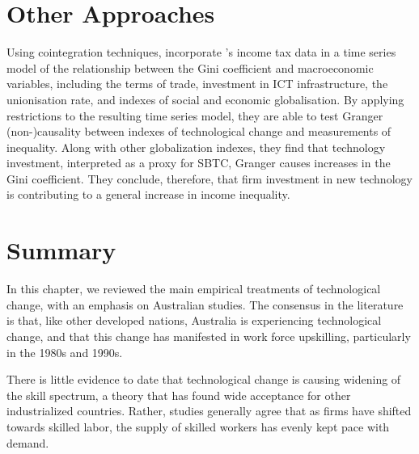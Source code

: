 
\section{Other Approaches}

Using cointegration techniques, \citet{Gaston2009} incorporate \citet{Leigh2005}'s income tax data in a time series model of the relationship between the Gini coefficient and macroeconomic variables, including the terms of trade, investment in ICT infrastructure, the unionisation rate, and indexes of social and economic globalisation. By applying restrictions to the resulting time series model, they are able to test Granger (non-)causality between indexes of technological change and measurements of inequality. Along with other globalization indexes, they find that technology investment, interpreted as a proxy for SBTC, Granger causes increases in the Gini coefficient. They conclude, therefore, that firm investment in new technology is contributing to a general increase in income inequality.

\section{Summary}

In this chapter, we reviewed the main empirical treatments of technological change, with an emphasis on Australian studies. The consensus in the literature is that, like other developed nations, Australia is experiencing technological change, and that this change has manifested in work force upskilling, particularly in the 1980s and 1990s.

There is little evidence to date that technological change is causing widening of the skill spectrum, a theory that has found wide acceptance for other industrialized countries. Rather, studies generally agree that as firms have shifted towards skilled labor, the supply of skilled workers has evenly kept pace with demand.


